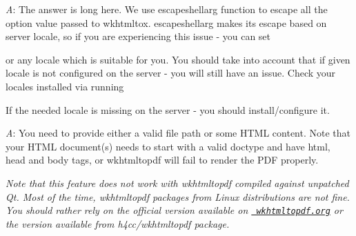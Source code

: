 
{\itshape A}\+: The answer is long here. We use {\ttfamily escapeshellarg} function to escape all the option value passed to {\ttfamily wkhtmltox}. {\ttfamily escapeshellarg} makes its escape based on server locale, so if you are experiencing this issue -\/ you can set 
\begin{DoxyCode}{0}

\end{DoxyCode}


or any locale which is suitable for you. You should take into account that if given locale is not configured on the server -\/ you will still have an issue. Check your locales installed via running 
\begin{DoxyCode}{0}

\end{DoxyCode}
 If the needed locale is missing on the server -\/ you should install/configure it.


{\itshape A}\+: You need to provide either a valid file path or some HTML content. Note that your HTML document(s) needs to start with a valid doctype and have html, head and body tags, or wkhtmltopdf will fail to render the PDF properly.

{\itshape Note that this feature does not work with wkhtmltopdf compiled against unpatched Qt. Most of the time, wkhtmltopdf packages from Linux distributions are not fine. You should rather rely on the official version available on \href{https://wkhtmltopdf.org}{\texttt{ wkhtmltopdf.\+org}} or the version available from {\ttfamily h4cc/wkhtmltopdf} package.}


